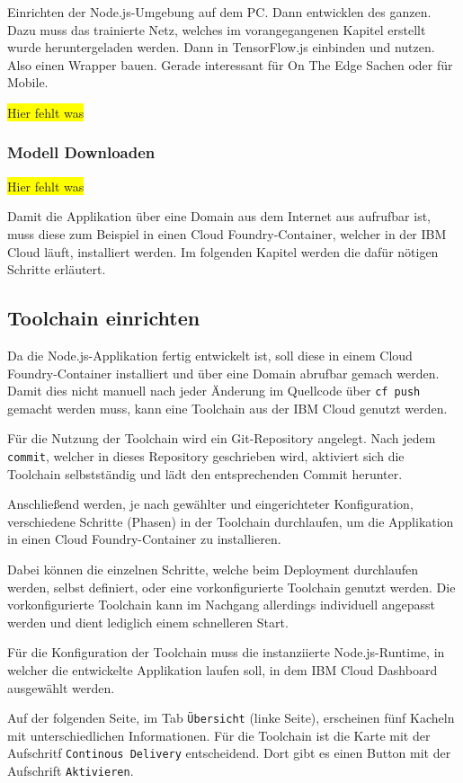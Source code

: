 Einrichten der Node.js-Umgebung auf dem PC. Dann entwicklen des ganzen. Dazu muss das trainierte Netz, welches im
vorangegangenen Kapitel erstellt wurde heruntergeladen werden. Dann in TensorFlow.js einbinden und nutzen. Also einen
Wrapper bauen. Gerade interessant für On The Edge Sachen oder für Mobile.

\colorbox{yellow}{Hier fehlt was}

\subsubsection{Modell Downloaden}
\colorbox{yellow}{Hier fehlt was}

Damit die Applikation über eine Domain aus dem Internet aus aufrufbar ist, muss diese zum Beispiel in einen Cloud
Foundry-Container, welcher in der IBM Cloud läuft, installiert werden. Im folgenden Kapitel werden die dafür nötigen
Schritte erläutert.

\subsection{Toolchain einrichten}
Da die Node.js-Applikation fertig entwickelt ist, soll diese in einem Cloud Foundry-Container installiert und über eine
Domain abrufbar gemach werden. Damit dies nicht manuell nach jeder Änderung im Quellcode über \texttt{cf push} gemacht
werden muss, kann eine Toolchain aus der IBM Cloud genutzt werden.

Für die Nutzung der Toolchain wird ein Git-Repository angelegt. Nach jedem \texttt{commit}, welcher in dieses Repository
geschrieben wird, aktiviert sich die Toolchain selbstständig und lädt den entsprechenden Commit herunter.

Anschließend werden, je nach gewählter und eingerichteter Konfiguration, verschiedene Schritte (Phasen) in der Toolchain
durchlaufen, um die Applikation in einen Cloud Foundry-Container zu installieren.

Dabei können die einzelnen Schritte, welche beim Deployment durchlaufen werden, selbst definiert, oder eine
vorkonfigurierte Toolchain genutzt werden. Die vorkonfigurierte Toolchain kann im Nachgang allerdings individuell
angepasst werden und dient lediglich einem schnelleren Start.

Für die Konfiguration der Toolchain muss die instanziierte Node.js-Runtime, in welcher die entwickelte Applikation laufen
soll, in dem IBM Cloud Dashboard ausgewählt werden.

Auf der folgenden Seite, im Tab \texttt{Übersicht} (linke Seite), erscheinen fünf Kacheln mit unterschiedlichen Informationen.
Für die Toolchain ist die Karte mit der Aufschritf \texttt{Continous Delivery} entscheidend. Dort gibt es einen Button
mit der Aufschrift \texttt{Aktivieren}.

